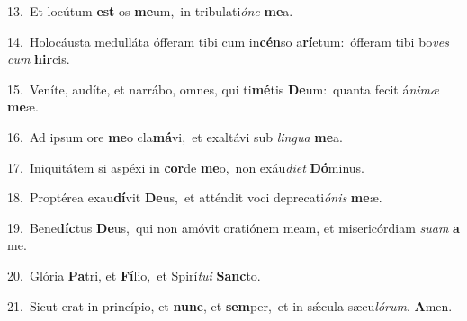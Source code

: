 {\numbfont\textcolor{\numbcolor}{13.}}~Et locútum \textbf{est} os \textbf{me}\-um,~\star in tribulati\-\textit{ó}\-\textit{ne} \textbf{me}\-a.\par
{\numbfont\textcolor{\numbcolor}{14.}}~Holocáusta medulláta ófferam tibi cum in\-\textbf{cén}\-so a\-\textbf{rí}\-etum:~\star ófferam tibi bo\textit{ves} \textit{cum} \textbf{hir}\-cis.\par
{\numbfont\textcolor{\numbcolor}{15.}}~Veníte, audíte, et narrábo, omnes, qui ti\-\textbf{mé}\-tis \textbf{De}\-um:~\star quanta fecit á\-\textit{ni}\-\textit{mæ} \textbf{me}\-æ.\par
{\numbfont\textcolor{\numbcolor}{16.}}~Ad ipsum ore \textbf{me}\-o cla\-\textbf{má}\-vi,~\star et exaltávi sub \textit{lin}\-\textit{gua} \textbf{me}\-a.\par
{\numbfont\textcolor{\numbcolor}{17.}}~Iniquitátem si aspéxi in \textbf{cor}\-de \textbf{me}\-o,~\star non exáu\-\textit{di}\-\textit{et} \textbf{Dó}\-minus.\par
{\numbfont\textcolor{\numbcolor}{18.}}~Proptérea exau\-\textbf{dí}\-vit \textbf{De}\-us,~\star et atténdit voci deprecati\-\textit{ó}\-\textit{nis} \textbf{me}\-æ.\par
{\numbfont\textcolor{\numbcolor}{19.}}~Bene\-\textbf{díc}\-tus \textbf{De}\-us,~\star qui non amóvit oratiónem meam, et misericórdiam \textit{su}\-\textit{am} \textbf{a} me.\par
{\numbfont\textcolor{\numbcolor}{20.}}~Glória \textbf{Pa}\-tri, et \textbf{Fí}\-lio,~\star et Spirí\-\textit{tu}\-\textit{i} \textbf{Sanc}\-to.\par
{\numbfont\textcolor{\numbcolor}{21.}}~Sicut erat in princípio, et \textbf{nunc}\-, et \textbf{sem}\-per,~\star et in sǽcula sæcu\-\textit{ló}\-\textit{rum}. \textbf{A}\-men.\par
